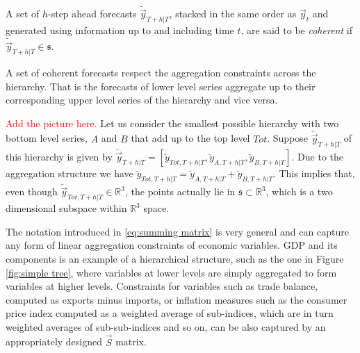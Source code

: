 \documentclass[graybox]{svmult}
\begin{document}
\begin{definition}
A set of $h$-step ahead forecasts $\tilde{\vec{y}}_{T+h|T}$, stacked in the same order as $\vec{y}_{t}$ and generated using information up to and including time $t$,
are said to be \textit{coherent} if $\tilde{\vec{y}}_{T+h|T} \in \mathfrak{s}$.
  \label{def:coherence}
\end{definition}

A set of coherent forecasts respect the aggregation constraints across the hierarchy. That is the forecasts of lower level series aggregate up to their corresponding upper level series of the hierarchy and vice versa.

\textcolor{red}{Add the picture here.}
Let us consider the smallest possible hierarchy with two bottom level series, $A$ and $B$ that add up to the top level $Tot$. Suppose $\breve{\vec{y}}_{T+h|T}$ of this hierarchy is given by $\breve{\vec{y}}_{T+h|T} = [\breve{y}_{Tot,T+h|T},\breve{y}_{A,T+h|T}, \breve{y}_{B,T+h|T}]$. Due to the aggregation structure we have $\breve{y}_{Tot,T+h|T}=\breve{y}_{A,T+h|T}+\breve{y}_{B,T+h|T}$. This implies that, even though  $\breve{\vec{y}}_{Tot,T+h|T} \in \mathbb{R}^3$, the points actually lie in $\mathfrak{s}\subset \mathbb{R}^3$, which is a two dimensional subspace within $\mathbb{R}^3$ space.

The notation introduced in \eqref{eq:summing matrix} is very general and can capture any form of linear aggregation constraints of economic variables. GDP and its components is an example of a hierarchical structure, such as the one in Figure \ref{fig:simple tree}, where variables at lower levels are simply aggregated to form variables at higher levels. Constraints for variables such as trade balance, computed as exports minus imports, or inflation measures such as the consumer price index computed as a weighted average of sub-indices, which are in turn weighted averages of sub-sub-indices and so on, can be also captured by an appropriately designed $\vec{S}$ matrix.
\end{document}
